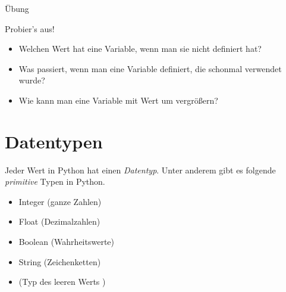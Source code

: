 \begin{frame}

\end{frame}

\begin{frame}{Übung}
	
	\begin{block}{Probier's aus!}
		\begin{itemize}
			\item Welchen Wert hat eine Variable, wenn man sie nicht definiert hat? 
			\item Was passiert, wenn man eine Variable definiert, die schonmal verwendet wurde?
			\item Wie kann man eine Variable mit Wert  um  vergrößern?
		\end{itemize}	
	\end{block}
	
\end{frame}


\section{Datentypen}

\begin{frame}
	\begin{block}{}
		Jeder Wert in Python hat einen \textit{Datentyp}. Unter anderem gibt es folgende \textit{primitive} Typen in Python.
		\begin{itemize}
			\item {}  Integer (ganze Zahlen)
			\item {} Float (Dezimalzahlen)
			\item {} Boolean (Wahrheitswerte)
			\item {}  String (Zeichenketten)
			\item {} (Typ des leeren Werts )
		\end{itemize}
	\end{block}
\end{frame}


